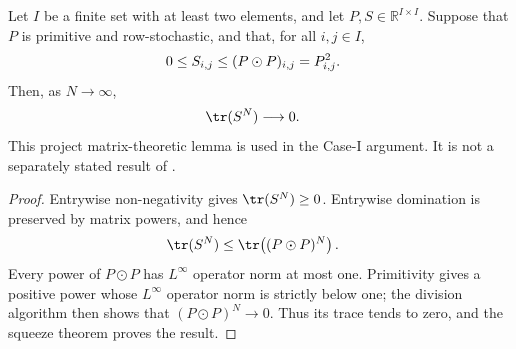 \begin{lemma}
    \label{thm:matrix_trace_pow_tendsto_zero_of_nonneg_le_hadamard_self}
    \leanok
    Let $I$ be a finite set with at least two elements, and let
    $P,S\in\mathbb R^{I\times I}$. Suppose that $P$ is primitive and
    row-stochastic, and that, for all $i,j\in I$,
    \begin{align}
        0\leq S_{i,j} & \leq(P\odot P)_{i,j}=P_{i,j}^2.
        \notag
    \end{align}
    Then, as $N\to\infty$,
    \begin{align}
        \tr(S^N) & \longrightarrow0.
        \notag
    \end{align}
    This project matrix-theoretic lemma is used in the Case-I argument. It
    is not a separately stated result of \cite{Cirac2016MPDO_arXiv}.
\end{lemma}

\begin{proof}
    \leanok
    Entrywise non-negativity gives $\tr(S^N)\geq0$. Entrywise domination is
    preserved by matrix powers, and hence
    \begin{align}
        \tr(S^N) & \leq\tr\!\left((P\odot P)^N\right).
        \notag
    \end{align}
    Every power of $P\odot P$ has $L^\infty$ operator norm at most one.
    Primitivity gives a positive power whose $L^\infty$ operator norm is
    strictly below one; the
    division algorithm then shows that $(P\odot P)^N\to0$. Thus its trace
    tends to zero, and the squeeze theorem proves the result.
\end{proof}

